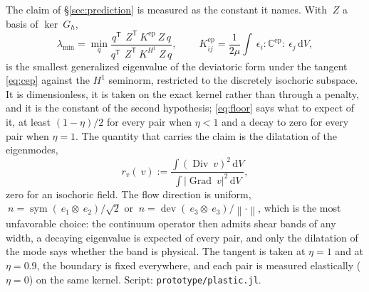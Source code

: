 \documentclass[11pt]{article}
\newcommand{\eps}{~\epsilon}
\newcommand{\Grad}{\operatorname{Grad}}
\newcommand{\Div}{\operatorname{Div}}
\newcommand{\dev}{\operatorname{dev}}
\newcommand{\sym}{\operatorname{sym}}
\newcommand{\transpose}[1]{#1^{\mathsf{T}}}
\newcommand{\norm}[1]{\left\lVert #1 \right\rVert}
\newcommand{\diff}{\,\mathrm{d}}
\newcommand{\code}[1]{\texttt{#1}}
\theoremstyle{definition}
\theoremstyle{plain}
\begin{document}
The claim of \S\ref{sec:prediction} is measured as the constant it names. With
$~Z$ a basis of $\ker ~G_h$,
\begin{equation}
  \label{eq:coercivity}
  \lambda_{\min} = \min_{q}
    \frac{\transpose{q}\,\transpose{~Z} ~K^{\mathrm{ep}} ~Z\, q}
         {\transpose{q}\,\transpose{~Z} ~K^{H^1} ~Z\, q},
  \qquad
  ~K^{\mathrm{ep}}_{ij} = \frac{1}{2\mu}\int \eps_i : \mathbb{C}^{\mathrm{ep}} : \eps_j \diff V,
\end{equation}
is the smallest generalized eigenvalue of the deviatoric form under the
tangent \eqref{eq:cep} against the $H^1$ seminorm, restricted to the
discretely isochoric subspace. It is dimensionless, it is taken on the exact
kernel rather than through a penalty, and it is the constant of the second
hypothesis; \eqref{eq:floor} says what to expect of it, at least
$(1-\eta)/2$ for every pair when $\eta < 1$ and a decay to zero for every
pair when $\eta = 1$. The quantity that carries the claim is the dilatation
of the eigenmodes,
\begin{equation}
  \label{eq:rv}
  r_v(~v) := \frac{\int (\Div ~v)^2 \diff V}{\int \lvert\Grad ~v\rvert^2 \diff V},
\end{equation}
zero for an isochoric field. The flow direction is uniform, $~n =
\sym(~e_1 \otimes ~e_2)/\sqrt{2}$ or $~n = \dev(~e_3 \otimes ~e_3)/\norm{\cdot}$,
which is the most unfavorable choice: the continuum operator then admits shear
bands of any width, a decaying eigenvalue is expected of every pair, and only
the dilatation of the mode says whether the band is physical. The tangent is
taken at $\eta = 1$ and at $\eta = 0.9$, the boundary is fixed everywhere,
and each pair is measured elastically ($\eta = 0$) on the same kernel.
Script: \code{prototype/plastic.jl}.
\end{document}
